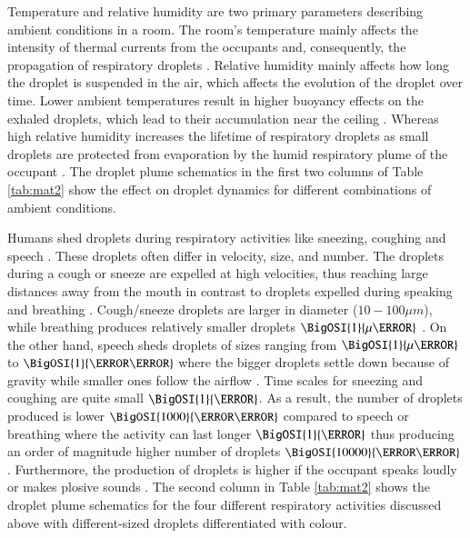 \documentclass[a4paper,12pt]{elsarticle}
\begin{document}
Temperature and relative humidity are two primary parameters describing ambient conditions in a room. The room's temperature mainly affects the intensity of thermal currents from the occupants and, consequently, the propagation of respiratory droplets \cite{feng2020study}. Relative humidity mainly affects how long the droplet is suspended in the air, which affects the evolution of the droplet over time. Lower ambient temperatures result in higher buoyancy effects on the exhaled droplets, which lead to their accumulation near the ceiling \cite{zhang2019distribution}. Whereas high relative humidity increases the lifetime of respiratory droplets as small droplets are protected from evaporation by the humid respiratory plume of the occupant \cite{chong2021extended}. The droplet plume schematics in the first two columns of Table \ref{tab:mat2} show the effect on droplet dynamics for different combinations of ambient conditions.

Humans shed droplets during respiratory activities like sneezing, coughing and speech \cite{stadnytskyi2021breathing}. These droplets often differ in velocity, size, and number. The droplets during a cough or sneeze are expelled at high velocities, thus reaching large distances away from the mouth in contrast to droplets expelled during speaking and breathing \cite{pendar2020numerical,zhang2019distribution}. Cough/sneeze droplets are larger in diameter ($ 10-100 \mu m$), while breathing produces relatively smaller droplets $\BigOSI{1}{\mu\meter}$ \cite{shao2021risk}. On the other hand, speech sheds droplets of sizes ranging from $\BigOSI{1}{\mu\meter}$ to $\BigOSI{1}{\milli\meter}$ where the bigger droplets settle down because of gravity while smaller ones follow the airflow \cite{tan2021experimental}. Time scales for sneezing and coughing are quite small $\BigOSI{1}{\second}$. As a result, the number of droplets produced is lower $\BigOSI{1000}{\per\second}$ compared to speech or breathing where the activity can last longer $\BigOSI{1}{\minute}$ thus producing an order of magnitude higher number of droplets $\BigOSI{10000}{\per\second}$ \cite{giri2022colliding}. Furthermore, the production of droplets is higher if the occupant speaks loudly or makes plosive sounds \cite{abkarian2020speech}. The second column in Table \ref{tab:mat2} shows the droplet plume schematics for the four different respiratory activities discussed above with different-sized droplets differentiated with colour.
\end{document}
